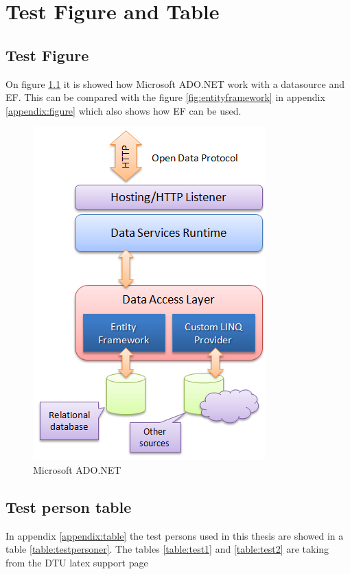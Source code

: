 \chapter{Test Figure and Table}



\section{Test Figure}
On figure \ref{fig:adonet} it is showed how Microsoft ADO.NET work with a datasource and EF. This can be compared with the figure \ref{fig:entityframework} in appendix \ref{appendix:figure} which also shows how EF can be used.
\begin{figure}
  \centering
 \includegraphics[scale=0.5]{figures/Entity-Framework2}
  \caption{Microsoft ADO.NET}
  \label{fig:adonet}
\end{figure}




\section{Test person table}
In appendix \ref{appendix:table} the test persons used in this thesis are showed in a table \ref{table:testpersoner}. The tables \ref{table:test1} and \ref{table:test2} are taking from the DTU latex support page\footnotemark
{}
